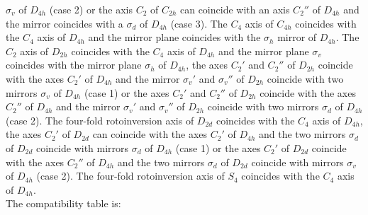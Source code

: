 \documentclass[12pt,a4paper,twoside]{report}
\begin{document}
$\sigma_v$ of $D_{4h}$ (case 2) or the axis $C_2$ of $C_{2h}$ can 
coincide with an axis $C_2''$ of $D_{4h}$ and the mirror coincides with a 
$\sigma_d$ of $D_{4h}$ (case 3). 
The $C_4$ axis of $C_{4h}$ coincides with the $C_4$ axis of $D_{4h}$ and
the mirror plane coincides with the $\sigma_h$ mirror of $D_{4h}$. 
The $C_2$ axis of $D_{2h}$ coincides with the $C_4$ axis of $D_{4h}$
and the mirror plane $\sigma_v$ coincides with the mirror plane $\sigma_h$
of $D_{4h}$, the axes $C_2'$ and $C_2''$ of $D_{2h}$ coincide with the 
axes $C_2'$ of $D_{4h}$ and the mirror $\sigma_v'$ and $\sigma_v''$ of $D_{2h}$
coincide with two mirrors $\sigma_v$ of $D_{4h}$ (case 1) or 
the axes $C_2'$ and $C_2''$ of $D_{2h}$ coincide with the axes $C_2''$ of
$D_{4h}$ and the mirror $\sigma_v'$ and $\sigma_v''$ of $D_{2h}$ 
coincide with two mirrors $\sigma_d$ of $D_{4h}$ (case 2).
The four-fold rotoinversion axis of $D_{2d}$ coincides with the $C_4$ axis of 
$D_{4h}$, the axes $C_2'$ of $D_{2d}$ can coincide with the 
axes $C_2'$ of $D_{4h}$ and the two mirrors $\sigma_d$ of $D_{2d}$
coincide with mirrors $\sigma_d$ of $D_{4h}$ (case 1) or 
the axes $C_2'$ of $D_{2d}$ coincide with the axes $C_2''$ of
$D_{4h}$ and the two mirrors $\sigma_d$ of $D_{2d}$ 
coincide with mirrors $\sigma_v$ of $D_{4h}$ (case 2).
The four-fold rotoinversion axis of $S_4$ coincides with the $C_4$ axis of 
$D_{4h}$. \\
The compatibility table is:
\end{document}
